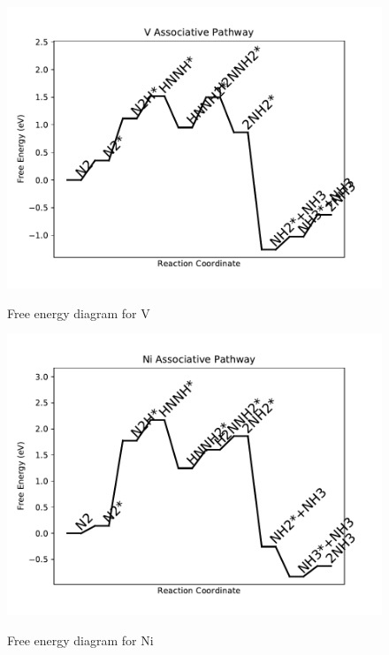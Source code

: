 \documentclass{article}
\begin{document}
\newpage
\begin{figure}
\includegraphics[width=1\linewidth]{data/plots/V_associative.pdf}
\label{fig:V_associative}
\caption{Free energy diagram for V}
\end{figure}

\begin{figure}
\includegraphics[width=1\linewidth]{data/plots/Ni_associative.pdf}
\label{fig:Ni_associative}
\caption{Free energy diagram for Ni}
\end{figure}
\end{document}
